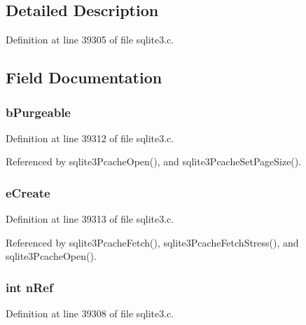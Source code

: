 \subsection{Detailed Description}


Definition at line 39305 of file sqlite3.\+c.



\subsection{Field Documentation}
\hypertarget{struct_p_cache_ab4fb5c5f22e7ed72cc027af77cf428e1}{}
\subsubsection[{b\+Purgeable}]{ b\+Purgeable}\label{struct_p_cache_ab4fb5c5f22e7ed72cc027af77cf428e1}


Definition at line 39312 of file sqlite3.\+c.



Referenced by sqlite3\+Pcache\+Open(), and sqlite3\+Pcache\+Set\+Page\+Size().

\hypertarget{struct_p_cache_a773207d76a6a250c080fac4c7d8ae00a}{}
\subsubsection[{e\+Create}]{ e\+Create}\label{struct_p_cache_a773207d76a6a250c080fac4c7d8ae00a}


Definition at line 39313 of file sqlite3.\+c.



Referenced by sqlite3\+Pcache\+Fetch(), sqlite3\+Pcache\+Fetch\+Stress(), and sqlite3\+Pcache\+Open().

\hypertarget{struct_p_cache_a3c459f9ae278c22b72583c55ca01acb7}{}
\subsubsection[{n\+Ref}]{\setlength{\rightskip}{0pt plus 5cm}int n\+Ref}\label{struct_p_cache_a3c459f9ae278c22b72583c55ca01acb7}


Definition at line 39308 of file sqlite3.\+c.



